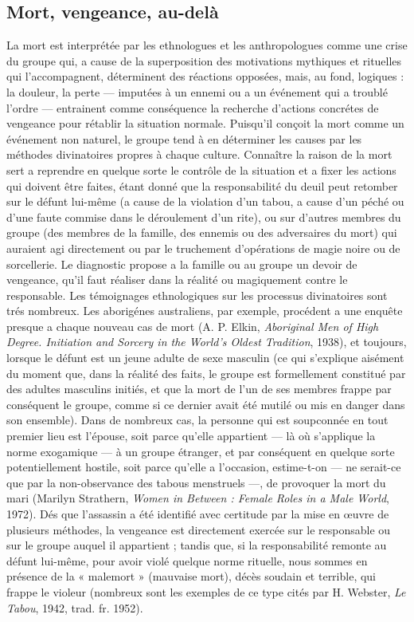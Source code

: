\subsection{Mort, vengeance, au-delà}

La mort est interprétée par les ethnologues et les anthropologues comme une crise du groupe qui, a cause de la superposition des motivations mythiques et rituelles qui l'accompagnent, déterminent des réactions opposées, mais, au fond, logiques : la douleur, la perte — imputées à un ennemi ou a un événement qui a troublé l'ordre — entrainent comme conséquence la recherche d'actions concrétes de vengeance pour rétablir la situation normale. Puisqu'il conçoit la mort comme un événement non naturel, le groupe tend à en déterminer les causes par les méthodes divinatoires propres à chaque culture. Connaître la raison de la mort sert a reprendre en quelque sorte le
contrôle de la situation et a fixer les actions qui doivent être faites, étant donné que la responsabilité du deuil peut retomber sur le défunt lui-même (a cause de la violation d'un tabou, a cause d'un péché ou d'une faute commise dans le déroulement d'un rite), ou sur d'autres membres du groupe (des membres de la famille, des ennemis ou des adversaires du mort) qui auraient agi directement ou par le truchement d'opérations de magie noire ou de sorcellerie. Le diagnostic propose a la famille ou au groupe un devoir de vengeance, qu'il faut réaliser dans la réalité ou magiquement contre le responsable. Les témoignages ethnologiques sur les processus divinatoires sont trés nombreux. Les aborigénes australiens, par exemple, procédent a une enquête presque a chaque nouveau cas de mort (A. P. Elkin, {\it Aboriginal Men of High Degree. Initiation and Sorcery in the World's Oldest Tradition}, 1938), et toujours, lorsque le défunt est un jeune adulte de sexe masculin (ce qui s'explique aisément du moment que, dans la réalité des faits, le groupe est formellement constitué par des adultes masculins initiés, et que la mort de l'un de ses membres frappe par conséquent le groupe, comme si ce dernier avait été mutilé ou mis en danger dans son ensemble). Dans de nombreux cas, la personne qui est soupconnée en tout premier lieu est l'épouse, soit parce qu'elle appartient — là où s'applique la norme exogamique — à un groupe étranger, et par conséquent en quelque sorte potentiellement hostile, soit parce qu'elle a l'occasion, estime-t-on — ne serait-ce que par la non-observance des tabous menstruels —, de provoquer la mort du mari (Marilyn Strathern, {\it Women in Between : Female Roles in a Male World}, 1972). Dés que l'assassin a été identifié avec certitude par la mise en {\oe}uvre de plusieurs méthodes, la vengeance est directement exercée sur le responsable ou sur le groupe auquel il appartient ; tandis que, si la responsabilité remonte au défunt lui-même, pour avoir violé quelque norme rituelle, nous sommes en présence de la « malemort » (mauvaise mort), décès soudain et terrible, qui frappe le violeur (nombreux sont les exemples de ce type cités par H. Webster, {\it Le Tabou}, 1942, trad. fr. 1952).

